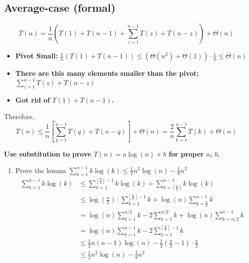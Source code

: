 \subsection{Average-case (formal)}
    \begin{derivation}
        \[
        T(n) = \frac{1}{n} \left( T(1) + T(n-1) + \sum_{z=1}^{n-1} T(z) + T(n-z) \right) + \Theta(n)
        \]

        \begin{itemize}
            \item \textbf{Pivot Small:} $\frac{1}{n} (T(1) + T(n-1)) \leq (\Theta(n^2) + \Theta(1)) \cdot \frac{1}{n} \leq \Theta(n)$
            
            \item \textbf{There are this many elements smaller than the pivot:} $\sum_{z=1}^{n-1} T(z) + T(n-z)$
            
            \item \textbf{Got rid of \( T(1) + T(n-1) \).}
        \end{itemize}
        \vspace{1em}

        Therefore,
        \[
        T(n) \leq \frac{1}{n} \left[ \sum_{q=1}^{n-1} T(q) + T(n-q) \right] + \Theta(n) = \frac{2}{n} \sum_{k=1}^{n-1} T(k) + \Theta(n)
        \]
        \vspace{1em}

        \textbf{Use substitution to prove \( T(n) = a \log(n) + b \) for proper \( a \), \( b \).}
        \begin{enumerate}
            \item Prove the lemma $\sum_{k=1}^{n-1} k \log(k) \leq \frac{1}{2} n^2 \log(n) - \frac{1}{8} n^2$
            \begin{align*}
                \sum_{k=1}^{n-1} k \log(k) &\leq \sum_{k=1}^{\left\lfloor \frac{n}{2} \right\rfloor-1} k \log(k) + \sum_{k=\left\lceil \frac{n}{2} \right\rceil}^{n-1} k \log(k) \\
                &\leq \log \left(\frac{n}{2}\right) \cdot \sum_{k=1}^{\left\lfloor \frac{n}{2} \right\rfloor-1} k + \log(n) \sum_{k=\frac{n}{2}}^{n-1} k \\
                &= \log(n) \sum_{k=1}^{n/2} k - 2 \sum_{k=1}^{n/2} k + \log(n) \sum_{k=n/2}^{n-1} k \\
                &= \log(n) \sum_{k=1}^{n-1} k - 2 \sum_{k=1}^{\left\lceil \frac{n}{2} \right\rceil-1} k \\
                &\leq \frac{1}{2}n(n-1) \log(n) - \frac{1}{2} \left(\frac{n}{2} - 1\right) \cdot \frac{n}{2} \\
                &\leq \frac{1}{2} n^2 \log(n) - \frac{1}{8} n^2
            \end{align*}


\end{enumerate}
\end{derivation}
